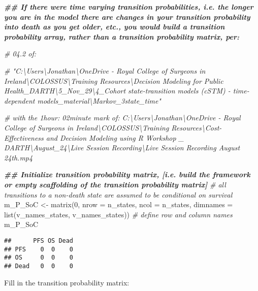 \documentclass[
]{article}
\newenvironment{Shaded}{\begin{snugshade}}{\end{snugshade}}
\newcommand{\AttributeTok}[1]{\textcolor[rgb]{0.77,0.63,0.00}{#1}}
\newcommand{\CommentTok}[1]{\textcolor[rgb]{0.56,0.35,0.01}{\textit{#1}}}
\newcommand{\DecValTok}[1]{\textcolor[rgb]{0.00,0.00,0.81}{#1}}
\newcommand{\DocumentationTok}[1]{\textcolor[rgb]{0.56,0.35,0.01}{\textbf{\textit{#1}}}}
\newcommand{\FunctionTok}[1]{\textcolor[rgb]{0.00,0.00,0.00}{#1}}
\newcommand{\NormalTok}[1]{#1}
\newcommand{\OtherTok}[1]{\textcolor[rgb]{0.56,0.35,0.01}{#1}}
\begin{document}
\begin{Shaded}
\begin{Highlighting}[]
\DocumentationTok{\#\# If there were time varying transition probabilities, i.e. the longer you are in the model there are changes in your transition probability into death as you get older, etc., you would build a transition probability array, rather than a transition probability matrix, per: }

\CommentTok{\# 04.2 of:}

\CommentTok{\# "C:\textbackslash{}Users\textbackslash{}Jonathan\textbackslash{}OneDrive {-} Royal College of Surgeons in Ireland\textbackslash{}COLOSSUS\textbackslash{}Training Resources\textbackslash{}Decision Modeling for Public Health\_DARTH\textbackslash{}5\_Nov\_29\textbackslash{}4\_Cohort state{-}transition models (cSTM) {-} time{-}dependent models\_material\textbackslash{}Markov\_3state\_time"}

\CommentTok{\# with the 1hour: 02minute mark of: C:\textbackslash{}Users\textbackslash{}Jonathan\textbackslash{}OneDrive {-} Royal College of Surgeons in Ireland\textbackslash{}COLOSSUS\textbackslash{}Training Resources\textbackslash{}Cost{-}Effectiveness and Decision Modeling using R Workshop \_ DARTH\textbackslash{}August\_24\textbackslash{}Live Session Recording\textbackslash{}Live Session Recording August 24th.mp4}


\DocumentationTok{\#\# Initialize transition probability matrix, [i.e. build the framework or empty scaffolding of the transition probability matrix]}
\CommentTok{\# all transitions to a non{-}death state are assumed to be conditional on survival }
\NormalTok{m\_P\_SoC  }\OtherTok{\textless{}{-}} \FunctionTok{matrix}\NormalTok{(}\DecValTok{0}\NormalTok{,}
                   \AttributeTok{nrow =}\NormalTok{ n\_states, }\AttributeTok{ncol =}\NormalTok{ n\_states,}
                   \AttributeTok{dimnames =} \FunctionTok{list}\NormalTok{(v\_names\_states, v\_names\_states)) }\CommentTok{\# define row and column names}
\NormalTok{m\_P\_SoC}
\end{Highlighting}
\end{Shaded}

\begin{verbatim}
##      PFS OS Dead
## PFS    0  0    0
## OS     0  0    0
## Dead   0  0    0
\end{verbatim}

Fill in the transition probability matrix:
\end{document}
